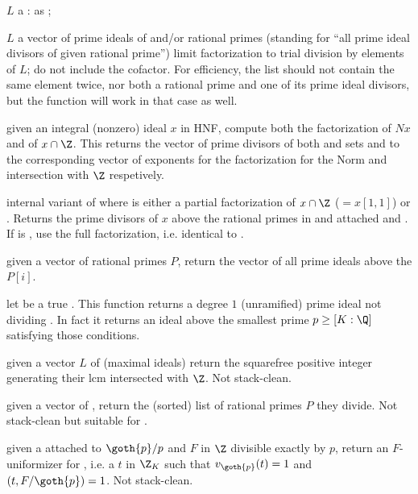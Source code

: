 \item $L$ a : as ;

\item $L$ a vector of prime ideals of  and/or rational primes
(standing for ``all prime ideal divisors of given rational prime'') limit
factorization to trial division by elements of $L$; do not include the
cofactor. For efficiency, the list should not contain the same element twice,
nor both a rational prime and one of its prime ideal divisors, but the
function will work in that case as well.

 given an integral
(nonzero) ideal $x$ in HNF, compute both the factorization of $Nx$ and
of $x\cap\Z$. This returns the vector of prime divisors of both
and sets  and  to the corresponding  vector
of exponents for the factorization for the Norm and intersection with $\Z$
respetively.

 internal
variant of  where  is either a partial
factorization of $x\cap \Z$ ($= x[1,1]$) or . Returns the prime
divisors of $x$ above the rational primes in  and attached 
and . If  is , use the full factorization, i.e.
identical to .

 given a vector of rational primes
$P$, return the vector of all prime ideals above the $P[i]$.

 let  be a true . This
function returns a degree $1$ (unramified) prime ideal not dividing
. In fact it returns an ideal above the smallest prime
$p \geq [K:\Q]$ satisfying those conditions.

 given a vector $L$ of 
(maximal ideals) return the squarefree positive integer generating their
lcm intersected with $\Z$. Not stack-clean.

 given a vector of ,
return the (sorted) list of rational primes $P$ they divide. Not
stack-clean but suitable for .

 given a  attached to
$\goth{p} / p$ and $F$ in $\Z$ divisible exactly by $p$, return an
$F$-uniformizer for , i.e. a $t$ in $\Z_K$ such that $v_{\goth{p}}(t)
= 1$ and $(t, F/\goth{p}) = 1$. Not stack-clean.

